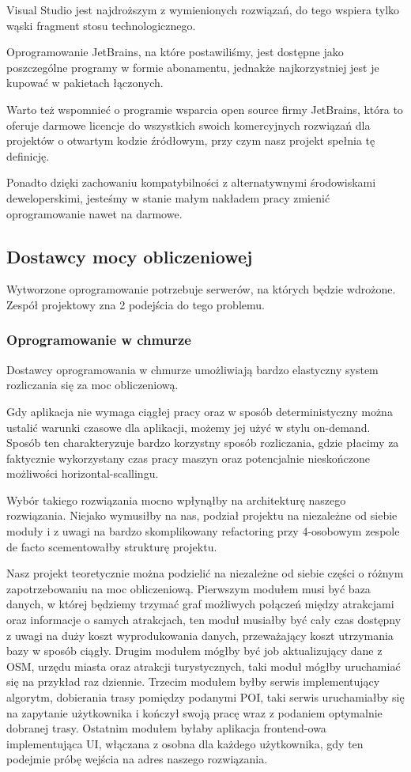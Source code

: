 Visual Studio jest najdroższym z wymienionych rozwiązań, do tego wspiera tylko wąski fragment stosu technologicznego.

Oprogramowanie JetBrains, na które postawiliśmy, jest dostępne jako poszczególne programy w formie abonamentu, jednakże najkorzystniej jest je kupować w pakietach łączonych.

Warto też wspomnieć o programie wsparcia open source firmy JetBrains, która to oferuje darmowe licencje do wszystkich swoich komercyjnych rozwiązań dla projektów o otwartym kodzie źródłowym, przy czym nasz projekt spełnia tę definicję.

Ponadto dzięki zachowaniu kompatybilności z alternatywnymi środowiskami deweloperskimi, jesteśmy w stanie małym nakładem pracy zmienić oprogramowanie nawet na darmowe.

\subsection{Dostawcy mocy obliczeniowej}
\label{subsec:dostawcy-mocy-obliczeniowej}
Wytworzone oprogramowanie potrzebuje serwerów, na których będzie wdrożone.
Zespół projektowy zna 2 podejścia do tego problemu.

\subsubsection{Oprogramowanie w chmurze}
Dostawcy oprogramowania w chmurze umożliwiają bardzo elastyczny system rozliczania się za moc obliczeniową.

Gdy aplikacja nie wymaga ciągłej pracy oraz w sposób deterministyczny można ustalić warunki czasowe dla aplikacji, możemy jej użyć w stylu \gls{on-demand}.
Sposób ten charakteryzuje bardzo korzystny sposób rozliczania, gdzie płacimy za faktycznie wykorzystany czas pracy maszyn oraz potencjalnie nieskończone możliwości horizontal-scallingu.

Wybór takiego rozwiązania mocno wpłynąłby na architekturę naszego rozwiązania.
Niejako wymusiłby na nas, podział projektu na niezależne od siebie moduły i z uwagi na bardzo skomplikowany \gls{refactoring} przy 4-osobowym zespole de facto scementowałby strukturę projektu.

Nasz projekt teoretycznie można podzielić na niezależne od siebie części o różnym zapotrzebowaniu na moc obliczeniową.
Pierwszym modułem musi być baza danych, w której będziemy trzymać graf możliwych połączeń między atrakcjami oraz informacje o samych atrakcjach, ten moduł musiałby być cały czas dostępny z uwagi na duży koszt wyprodukowania danych, przeważający koszt utrzymania bazy w sposób ciągły.
Drugim modułem mógłby być \gls{job} aktualizujący dane z OSM, urzędu miasta oraz atrakcji turystycznych, taki moduł mógłby uruchamiać się na przykład raz dziennie.
Trzecim modułem byłby serwis implementujący algorytm, dobierania trasy pomiędzy podanymi POI, taki serwis uruchamiałby się na zapytanie użytkownika i kończył swoją pracę wraz z podaniem optymalnie dobranej trasy.
Ostatnim modułem byłaby aplikacja \gls{frontend}-owa implementująca UI, włączana z osobna dla każdego użytkownika, gdy ten podejmie próbę wejścia na adres naszego rozwiązania.

